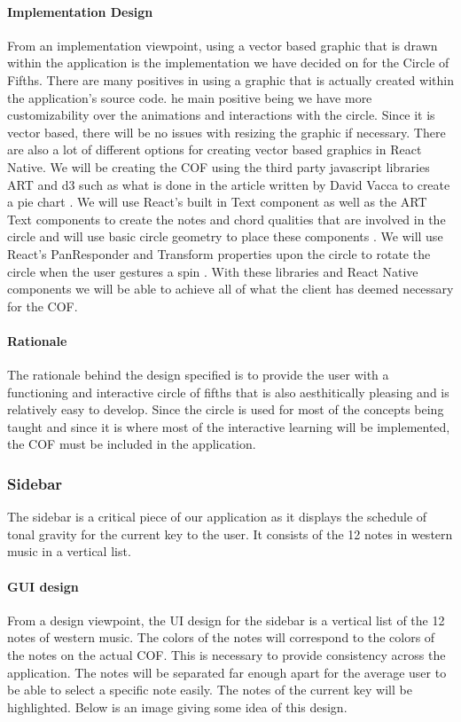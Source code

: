 \documentclass[onecolumn, draftclsnofoot,10pt, compsoc]{IEEEtran}
\begin{document}
\paragraph{Implementation Design}
From an implementation viewpoint, using a vector based graphic that is drawn within the application is the implementation we have decided on for the Circle of Fifths.
There are many positives in using a graphic that is actually created within the application's source code.
he main positive being we have more customizability over the animations and interactions with the circle.
Since it is vector based, there will be no issues with resizing the graphic if necessary.
There are also a lot of different options for creating vector based graphics in React Native.
We will be creating the COF using the third party javascript libraries ART and d3 such as what is done in the article written by David Vacca to create a pie chart \cite{medium}.
We will use React’s built in Text component as well as the ART Text components to create the notes and chord qualities that are involved in the circle and will use basic circle geometry to place these components \cite{react-text} \cite{seb}.
We will use React’s PanResponder and Transform properties upon the circle to rotate the circle when the user gestures a spin \cite{react-pan} \cite{react-transforms}.
With these libraries and React Native components we will be able to achieve all of what the client has deemed necessary for the COF.

\paragraph{Rationale}
The rationale behind the design specified is to provide the user with a functioning and interactive circle of fifths that is also aesthitically pleasing and is relatively easy to develop.
Since the circle is used for most of the concepts being taught and since it is where most of the interactive learning will be implemented, the COF must be included in the application.

\subsubsection{Sidebar}
The sidebar is a critical piece of our application as it displays the schedule of tonal gravity for the current key to the user.
It consists of the 12 notes in western music in a vertical list.

\paragraph{GUI design}
From a design viewpoint, the UI design for the sidebar is a vertical list of the 12 notes of western music.
The colors of the notes will correspond to the colors of the notes on the actual COF.
This is necessary to provide consistency across the application.
The notes will be separated far enough apart for the average user to be able to select a specific note easily.
The notes of the current key will be highlighted.
Below is an image giving some idea of this design.
\end{document}
